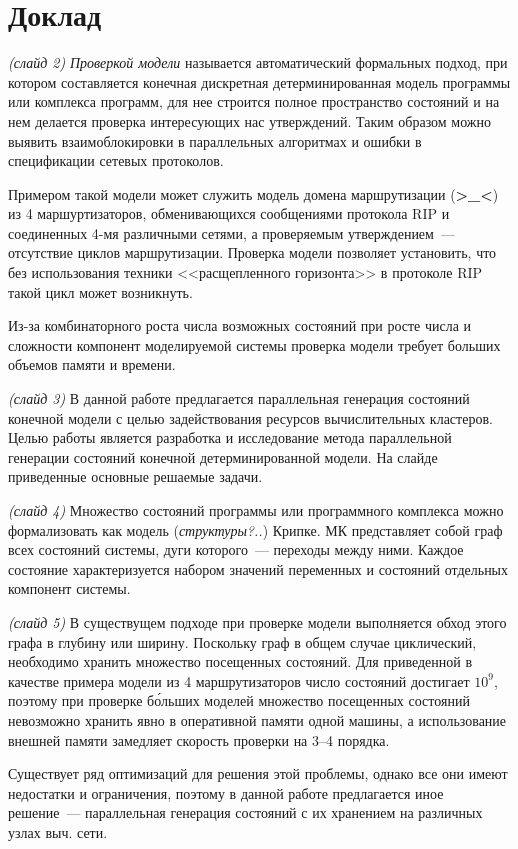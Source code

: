\documentclass[a4paper,12pt,notitlepage]{article}
\begin{document}
\section{Доклад}

\emph{(слайд 2)} \emph{Проверкой модели} называется автоматический формальных подход, при
котором составляется конечная дискретная детерминированная модель программы или комплекса
программ, для нее строится полное пространство состояний и на нем делается проверка
интересующих нас утверждений. Таким образом можно выявить взаимоблокировки в параллельных
алгоритмах и ошибки в спецификации сетевых протоколов.

Примером такой модели может служить модель домена маршрутизации (\textbf{>\_<}) из 4
маршуртизаторов, обменивающихся сообщениями протокола RIP и соединенных 4-мя различными
сетями, а проверяемым утверждением~--- отсутствие циклов маршрутизации. Проверка модели
позволяет установить, что без использования техники <<расщепленного горизонта>> в
протоколе RIP такой цикл может возникнуть.

Из-за комбинаторного роста числа возможных состояний при росте числа и сложности компонент
моделируемой системы проверка модели требует больших объемов памяти и времени.

\emph{(слайд 3)} В данной работе предлагается параллельная генерация состояний конечной
модели с целью задействования ресурсов вычислительных кластеров. Целью работы является
разработка и исследование метода параллельной генерации состояний конечной
детерминированной модели. На слайде приведенные основные решаемые задачи.

\emph{(слайд 4)} Множество состояний программы или программного комплекса можно
формализовать как модель (\emph{структуры?..}) Крипке. МК представляет собой граф всех
состояний системы, дуги которого~--- переходы между ними. Каждое состояние характеризуется
набором значений переменных и состояний отдельных компонент системы.

\emph{(слайд 5)} В существущем подходе при проверке модели выполняется обход этого графа в
глубину или ширину. Поскольку граф в общем случае циклический, необходимо хранить
множество посещенных состояний. Для приведенной в качестве примера модели из 4
маршрутизаторов число состояний достигает $10^9$, поэтому при проверке б\'{о}льших моделей
множество посещенных состояний невозможно хранить явно в оперативной памяти одной машины,
а использование внешней памяти замедляет скорость проверки на 3--4 порядка.

Существует ряд оптимизаций для решения этой проблемы, однако все они имеют недостатки и
ограничения, поэтому в данной работе предлагается иное решение~--- параллельная генерация
состояний с их хранением на различных узлах выч. сети.
\end{document}
